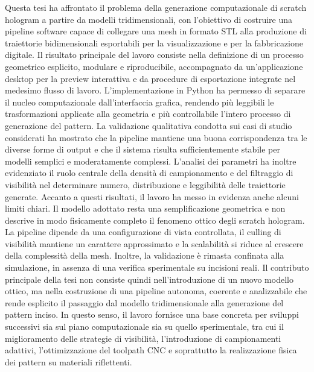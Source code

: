 \documentclass[a4paper,11pt,titlepage,twoside]{book}
\newcommand{\1}{\mathbf{1}}
\numberwithin{equation}{chapter}
\theoremstyle{plain}
\theoremstyle{definition}
\begin{document}
	Questa tesi ha affrontato il problema della generazione computazionale di scratch hologram a partire da modelli tridimensionali, con l’obiettivo di costruire una pipeline software capace di collegare una mesh in formato STL alla produzione di traiettorie bidimensionali esportabili per la visualizzazione e per la fabbricazione digitale.
	Il risultato principale del lavoro consiste nella definizione di un processo geometrico esplicito, modulare e riproducibile, accompagnato da un’applicazione desktop per la preview interattiva e da procedure di esportazione integrate nel medesimo flusso di lavoro. L’implementazione in Python ha permesso di separare il nucleo computazionale dall’interfaccia grafica, rendendo più leggibili le trasformazioni applicate alla geometria e più controllabile l’intero processo di generazione del pattern.
	La validazione qualitativa condotta sui casi di studio considerati ha mostrato che la pipeline mantiene una buona corrispondenza tra le diverse forme di output e che il sistema risulta sufficientemente stabile per modelli semplici e moderatamente complessi. L’analisi dei parametri ha inoltre evidenziato il ruolo centrale della densità di campionamento e del filtraggio di visibilità nel determinare numero, distribuzione e leggibilità delle traiettorie generate.
	Accanto a questi risultati, il lavoro ha messo in evidenza anche alcuni limiti chiari. Il modello adottato resta una semplificazione geometrica e non descrive in modo fisicamente completo il fenomeno ottico degli scratch hologram. La pipeline dipende da una configurazione di vista controllata, il culling di visibilità mantiene un carattere approssimato e la scalabilità si riduce al crescere della complessità della mesh. Inoltre, la validazione è rimasta confinata alla simulazione, in assenza di una verifica sperimentale su incisioni reali.
	Il contributo principale della tesi non consiste quindi nell’introduzione di un nuovo modello ottico, ma nella costruzione di una pipeline autonoma, coerente e analizzabile che rende esplicito il passaggio dal modello tridimensionale alla generazione del pattern inciso. In questo senso, il lavoro fornisce una base concreta per sviluppi successivi sia sul piano computazionale sia su quello sperimentale, tra cui il miglioramento delle strategie di visibilità, l’introduzione di campionamenti adattivi, l’ottimizzazione del toolpath CNC e soprattutto la realizzazione fisica dei pattern su materiali riflettenti.
	
	\clearpage
	
	\appendix
	\renewcommand{\chaptername}{Appendice}
	
\end{document}
